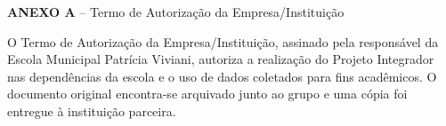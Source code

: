 
\noindent\textbf{ANEXO A} -- Termo de Autorização da Empresa/Instituição

\vspace{\baselineskip}

O Termo de Autorização da Empresa/Instituição, assinado pela responsável da Escola Municipal Patrícia Viviani, autoriza a realização do Projeto Integrador nas dependências da escola e o uso de dados coletados para fins acadêmicos. O documento original encontra-se arquivado junto ao grupo e uma cópia foi entregue à instituição parceira.
